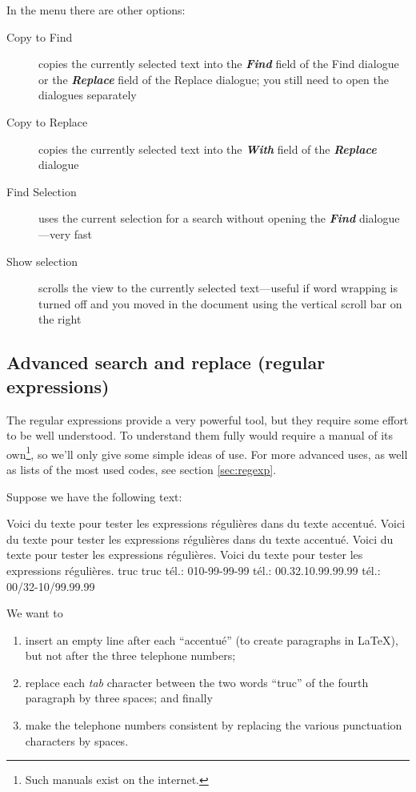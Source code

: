 In the  menu there are other options:
\begin{description}
\item[Copy to Find] copies the currently selected text into the \textsl{\textbf{Find}} field of the Find dialogue or the \textsl{\textbf{Replace}} field of the Replace dialogue; you still need to open the dialogues separately
\item[Copy to Replace] copies the currently selected text into the \textsl{\textbf{With}} field of the \textsl{\textbf{Replace}} dialogue
\item[Find Selection] uses the current selection for a search without opening the \textsl{\textbf{Find}} dialogue---very fast
\item[Show selection] scrolls the view to the currently selected text---useful if word wrapping is turned off and you moved in the document using the vertical scroll bar on the right
\end{description}

\subsection{Advanced search and replace (regular expressions)}

The regular expressions provide a very powerful tool, but they require some effort to be well understood. To understand them fully would require a manual of its own\footnote{Such manuals exist on the internet.}, so we'll only give some simple ideas of use. For more advanced uses, as well as lists of the most used codes, see section \ref{sec:regexp}.

Suppose we have the following text:
\begin{verbExample}
Voici du texte pour tester les expressions régulières dans du texte
accentué. 
Voici du texte pour tester les expressions régulières dans du texte
accentué. 
Voici du texte pour tester les expressions régulières. Voici du
texte pour tester les expressions régulières. 
truc          truc
tél.: 010-99-99-99
tél.: 00.32.10.99.99.99
tél.: 00/32-10/99.99.99
\end{verbExample}
We want to
\begin{enumerate}
	\item insert an empty line after each ``accentué'' (to create paragraphs in {\LaTeX}), but not after the three telephone numbers;
	\item replace each \textsl{tab} character between the two words ``truc'' of the fourth paragraph by three spaces; and finally
	\item make the telephone numbers consistent by replacing the various punctuation characters by spaces.
\end{enumerate}


